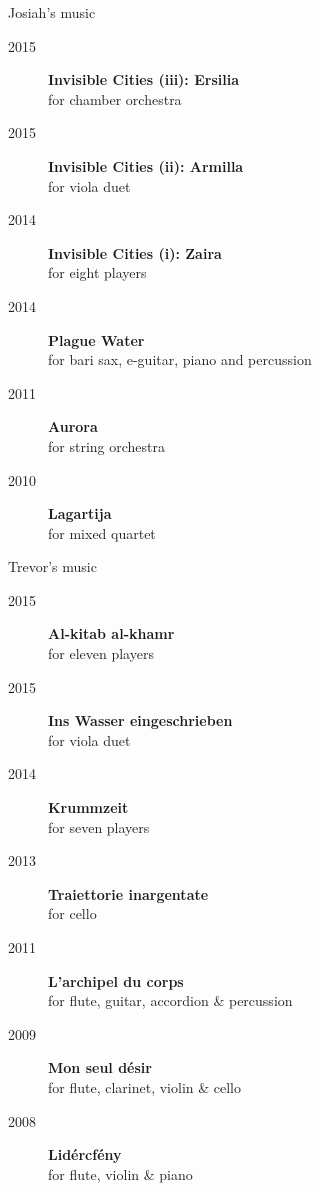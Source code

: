 \documentclass[10pt]{beamer}
\begin{document}
\begin{frame}{Josiah's music}
    \begin{description}
        \item[2015] \textbf{Invisible Cities (iii): Ersilia} \\
            for chamber orchestra
        \item[2015] \textbf{Invisible Cities (ii): Armilla} \\
            for viola duet
        \item[2014] \textbf{Invisible Cities (i): Zaira} \\
            for eight players
        \item[2014] \textbf{Plague Water} \\
            for bari sax, e-guitar, piano and percussion
        \item[2011] \textbf{Aurora} \\
            for string orchestra
        \item[2010] \textbf{Lagartija} \\
            for mixed quartet
    \end{description}
\end{frame}

\begin{frame}{Trevor's music}
    \begin{description}
        \item[2015] \textbf{Al-kitab al-khamr} \\
            for eleven players
        \item[2015] \textbf{Ins Wasser eingeschrieben} \\
            for viola duet
        \item[2014] \textbf{Krummzeit} \\
            for seven players
        \item[2013] \textbf{Traiettorie inargentate} \\
            for cello
        \item[2011] \textbf{L'archipel du corps} \\
            for flute, guitar, accordion \& percussion
        \item[2009] \textbf{Mon seul désir} \\
            for flute, clarinet, violin \& cello
        \item[2008] \textbf{Lidércfény} \\
            for flute, violin \& piano
    \end{description}
\end{frame}
\end{document}
